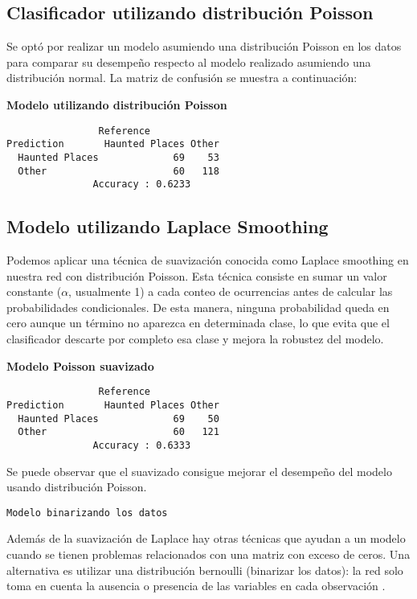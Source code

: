 \documentclass[eng]{ajceam-class}
\begin{document}
\subsection{Clasificador utilizando distribución Poisson}

Se optó por realizar un modelo asumiendo una distribución Poisson en los datos para comparar su desempeño respecto al modelo realizado asumiendo una distribución normal. La matriz de confusión se muestra a continuación:

\textbf{Modelo utilizando distribución Poisson}
\begin{verbatim}
                Reference
Prediction       Haunted Places Other
  Haunted Places             69    53
  Other                      60   118
               Accuracy : 0.6233
\end{verbatim}



\subsection{Modelo utilizando Laplace Smoothing}

Podemos aplicar una técnica de suavización conocida como Laplace smoothing en nuestra red con distribución Poisson. Esta técnica consiste en sumar un valor constante ($\alpha$, usualmente 1) a cada conteo de ocurrencias antes de calcular las probabilidades condicionales. De esta manera, ninguna probabilidad queda en cero aunque un término no aparezca en determinada clase, lo que evita que el clasificador descarte por completo esa clase y mejora la robustez del modelo.

\textbf{Modelo Poisson suavizado}
\begin{verbatim}
                Reference
Prediction       Haunted Places Other
  Haunted Places             69    50
  Other                      60   121
               Accuracy : 0.6333
\end{verbatim}

Se puede observar que el suavizado consigue mejorar el desempeño del modelo usando distribución Poisson.

\texttt{Modelo binarizando los datos}

Además de la suavización de Laplace hay otras técnicas que ayudan a un modelo cuando se tienen problemas relacionados con una matriz con exceso de ceros. Una alternativa es utilizar una distribución bernoulli (binarizar los datos): la red solo toma en cuenta la ausencia o presencia de las variables en cada observación \cite{pmlr-vR4-eyheramendy03a}.
\end{document}
